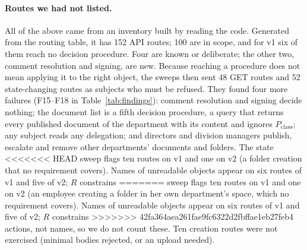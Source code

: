 \documentclass[sigconf,review,anonymous]{acmart}
\newcommand{\Pc}{P_{\mathrm{class}}}
\begin{document}
\paragraph{Routes we had not listed.} All of the above came from an inventory built by reading the code. Generated
from the routing table, it has 152 API routes; 100 are in scope, and for v1 six of them reach no decision procedure.
Four are known or deliberate; the other two, comment resolution and signing, are new. Because reaching a procedure
does not mean applying it to the right object, the sweeps then sent 48 GET routes and 52 state-changing routes as
subjects who must be refused. They found four more failures (F15--F18 in Table~\ref{tab:findings}): comment
resolution and signing decide nothing; the document list is a fifth decision procedure, a query that returns every
published document of the department with its content and ignores $\Pc$; any subject reads any delegation; and
directors and division managers publish, escalate and remove other departments' documents and folders. The state
<<<<<<< HEAD
sweep flags ten routes on v1 and one on v2 (a folder creation that no requirement covers). Names of unreadable objects appear on six routes of v1 and five of v2; $R$ constrains
=======
sweep flags ten routes on v1 and one on v2 (an employee creating a folder in her own department's space, which no
requirement covers). Names of unreadable objects appear on six routes of v1 and five of v2; $R$ constrains
>>>>>>> 42fa364aea261fae9fc6322d2fbffae1eb27feb4
actions, not names, so we do not count these. Ten creation routes were not exercised (minimal bodies rejected, or an
upload needed).
\end{document}
